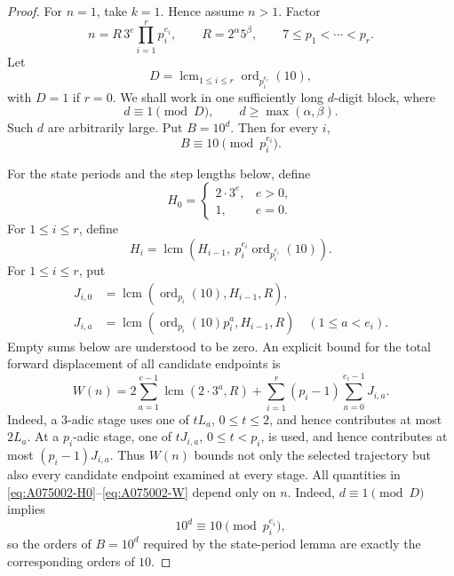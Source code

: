 \documentclass[11pt]{amsart}
\theoremstyle{remark}
\newcommand{\ord}{\operatorname{ord}}
\begin{document}
\begin{proof}
For \(n=1\), take \(k=1\).  Hence assume \(n>1\).
Factor
\begin{equation}\label{eq:A075002-factorization}
n=R\,3^e\prod_{i=1}^r p_i^{e_i},
\qquad
R=2^\alpha5^\beta,
\qquad
7\le p_1<\cdots<p_r.
\end{equation}
Let
\[
D=\operatorname{lcm}_{1\le i\le r}\ord_{p_i^{e_i}}(10),
\]
with \(D=1\) if \(r=0\).  We shall work in one sufficiently long \(d\)-digit block, where
\begin{equation}\label{eq:A075002-digit-choice}
d\equiv1\pmod D,
\qquad d\ge\max(\alpha,\beta).
\end{equation}
Such \(d\) are arbitrarily large.  Put \(B=10^d\).  Then for every \(i\),
\[
B\equiv10\pmod{p_i^{e_i}}.
\]

For the state periods and the step lengths below, define
\begin{equation}\label{eq:A075002-H0}
H_0=
\begin{cases}
2\cdot3^e,&e>0,\\
1,&e=0.
\end{cases}
\end{equation}
For \(1\le i\le r\), define
\begin{equation}\label{eq:A075002-Hi}
H_i=\operatorname{lcm}\!\left(
H_{i-1},\ p_i^{e_i}\ord_{p_i^{e_i}}(10)
\right).
\end{equation}
For \(1\le i\le r\), put
\begin{equation}\label{eq:A075002-Jia}
\begin{aligned}
J_{i,0}&=\operatorname{lcm}\!\left(\ord_{p_i}(10),H_{i-1},R\right),\\
J_{i,a}&=\operatorname{lcm}\!\left(\ord_{p_i}(10)p_i^a,H_{i-1},R\right)
\quad(1\le a<e_i).
\end{aligned}
\end{equation}
Empty sums below are understood to be zero.  An explicit bound for the total forward
displacement of all candidate endpoints is
\begin{equation}\label{eq:A075002-W}
W(n)=
2\sum_{a=1}^{e-1}\operatorname{lcm}(2\cdot3^a,R)
+
\sum_{i=1}^r(p_i-1)\sum_{a=0}^{e_i-1}J_{i,a}.
\end{equation}
Indeed, a \(3\)-adic stage uses one of \(tL_a\), \(0\le t\le2\), and hence contributes
at most \(2L_a\).  At a \(p_i\)-adic stage, one of \(tJ_{i,a}\), \(0\le t<p_i\), is
used, and hence contributes at most \((p_i-1)J_{i,a}\).  Thus \(W(n)\) bounds not only
the selected trajectory but also every candidate endpoint examined at every stage.
All quantities in \eqref{eq:A075002-H0}--\eqref{eq:A075002-W} depend only on \(n\).
Indeed, \(d\equiv1\pmod D\) implies
\[
10^d\equiv10\pmod{p_i^{e_i}},
\]
so the orders of \(B=10^d\) required by the state-period lemma are exactly the
corresponding orders of \(10\).


\end{proof}
\end{document}
